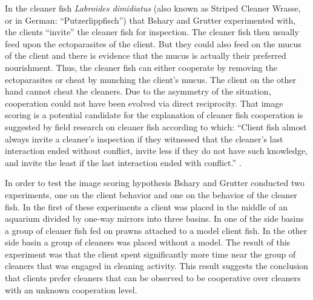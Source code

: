 In the cleaner fish {\em Labroides dimidiatus} (also known as Striped Cleaner
Wrasse, or in German: ``Putzerlippfisch'') that Bshary and Grutter
experimented with, the clients ``invite'' the cleaner fish for inspection.
The cleaner fish then usually feed upon the ectoparasites of the client. But
they could also feed on the mucus of the client and there is evidence that the
mucus is actually their preferred nourishment. Thus, the cleaner fish can
either cooperate by removing the ectoparasites or cheat by munching the
client's mucus. The client on the other hand cannot cheat the cleaners. Due to
the asymmetry of the situation, cooperation could not have been evolved via
direct reciprocity. That image scoring is a potential candidate for the
explanation of cleaner fish cooperation is suggested by field research on
cleaner fish according to which: ``Client fish almost always invite a
cleaner's inspection if they witnessed that the cleaner's last interaction ended
without conflict, invite less if they do not have such knowledge, and invite the
least if the last interaction ended with conflict.''
\cite[p.\ 975]{bshary-grutter:2006}.

In order to test the image scoring hypothesis Bshary and Grutter conducted two
experiments, one on the client behavior and one on the behavior of the
cleaner fish. In the first of these experiments a client was placed in the
middle of an aquarium divided by one-way mirrors into three basins. In one of
the side basins a group of cleaner fish fed on prawns attached to a model
client fish. In the other side basin a group of cleaners was placed without a
model. The result of this experiment was that the client spent significantly
more time near the group of cleaners that was engaged in cleaning activity.
This result suggests the conclusion that clients prefer cleaners that can be
observed to be cooperative over cleaners with an unknown cooperation level.

